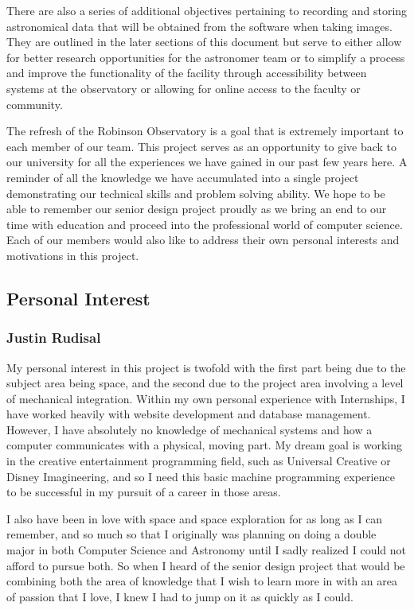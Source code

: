 \documentclass[12pt]{report}
\begin{document}
There are also a series of additional objectives pertaining to recording and storing astronomical data that will be obtained from the software when taking images.  They are outlined in the later sections of this document but serve to either allow for better research opportunities for the astronomer team or to simplify a process and improve the functionality of the facility through accessibility between systems at the observatory or allowing for online access to the faculty or community.

The refresh of the Robinson Observatory is a goal that is extremely important to each member of our team.  This project serves as an opportunity to give back to our university for all the experiences we have gained in our past few years here.  A reminder of all the knowledge we have accumulated into a single project demonstrating our technical skills and problem solving ability.  We hope to be able to remember our senior design project proudly as we bring an end to our time with education and proceed into the professional world of computer science.  Each of our members would also like to address their own personal interests and motivations in this project.

\subsection*{Personal Interest}

\subsubsection*{Justin Rudisal}

My personal interest in this project is twofold with the first part being due to the subject area being space, and the second due to the project area involving a level of mechanical integration. Within my own personal experience with Internships, I have worked heavily with website development and database management. However, I have absolutely no knowledge of mechanical systems and how a computer communicates with a physical, moving part. My dream goal is working in the creative entertainment programming field, such as Universal Creative or Disney Imagineering, and so I need this basic machine programming experience to be successful in my pursuit of a career in those areas.

I also have been in love with space and space exploration for as long as I can remember, and so much so that I originally was planning on doing a double major in both Computer Science and Astronomy until I sadly realized I could not afford to pursue both. So when I heard of the senior design project that would be combining both the area of knowledge that I wish to learn more in with an area of passion that I love, I knew I had to jump on it as quickly as I could.
\end{document}
